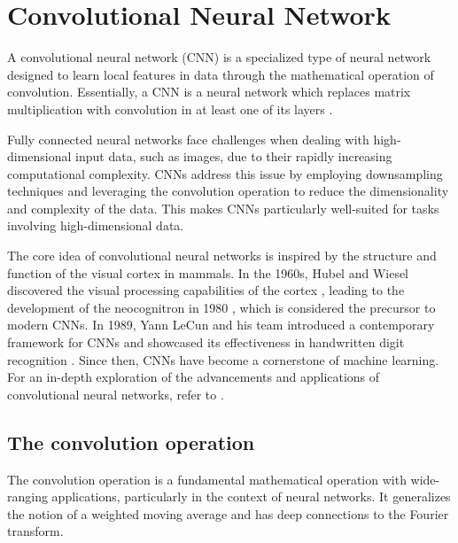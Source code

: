 \documentclass[../../thesis.tex]{subfiles}
\begin{document}
\section{Convolutional Neural Network}

A convolutional neural network (CNN) is a specialized type of neural network designed to learn local features in data through the mathematical operation of convolution. Essentially, a CNN is a neural network which replaces matrix multiplication with convolution in at least one of its layers \cite{deeplearningbook}. \newline

Fully connected neural networks face challenges when dealing with high-dimensional input data, such as images, due to their rapidly increasing computational complexity. CNNs address this issue by employing downsampling techniques and leveraging the convolution operation to reduce the dimensionality and complexity of the data. This makes CNNs particularly well-suited for tasks involving high-dimensional data.\newline

The core idea of convolutional neural networks is inspired by the structure and function of the visual cortex in mammals. In the 1960s, Hubel and Wiesel discovered the visual processing capabilities of the cortex \cite{https://doi.org/10.1113/jphysiol.1968.sp008455}, leading to the development of the neocognitron in 1980 \cite{6313076}, which is considered the precursor to modern CNNs. In 1989, Yann LeCun and his team introduced a contemporary framework for CNNs and showcased its effectiveness in handwritten digit recognition \cite{LeCun1989ConvNet}. Since then, CNNs have become a cornerstone of machine learning. For an in-depth exploration of the advancements and applications of convolutional neural networks, refer to \cite{gu2017recent}.

\subsection{The convolution operation}

The convolution operation is a fundamental mathematical operation with wide-ranging applications, particularly in the context of neural networks. It generalizes the notion of a weighted moving average and has deep connections to the Fourier transform.\newline
\end{document}
